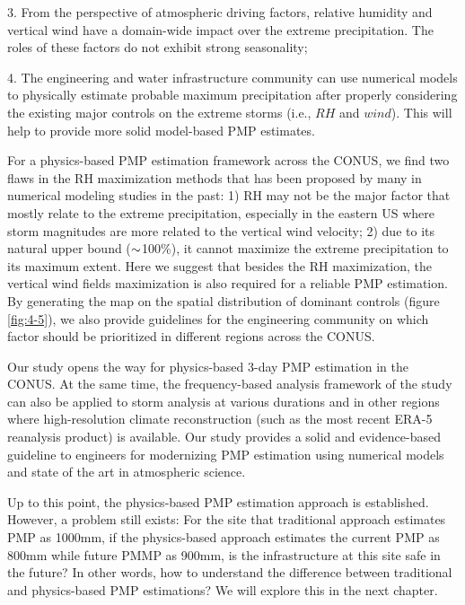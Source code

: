 3.	From the perspective of atmospheric driving factors, relative humidity and vertical wind have a domain-wide impact over the extreme precipitation. The roles of these factors do not exhibit strong seasonality;

4.	The engineering and water infrastructure community can use numerical models to physically estimate probable maximum precipitation after properly considering the existing major controls on the extreme storms (i.e., $RH$ and $wind$). This will help to provide more solid model-based PMP estimates.

For a physics-based PMP estimation framework across the CONUS, we find two flaws in the RH maximization methods that has been proposed by many in numerical modeling studies in the past: 1) RH may not be the major factor that mostly relate to the extreme precipitation, especially in the eastern US where storm magnitudes are more related to the vertical wind velocity; 2) due to its natural upper bound ($\scriptsize{\sim}$100\%), it cannot maximize the extreme precipitation to its maximum extent. Here we suggest that besides the RH maximization, the vertical wind fields maximization is also required for a reliable PMP estimation. By generating the map on the spatial distribution of dominant controls (figure \ref{fig:4-5}), we also provide guidelines for the engineering community on which factor should be prioritized in different regions across the CONUS.

Our study opens the way for physics-based 3-day PMP estimation in the CONUS. At the same time, the frequency-based analysis framework of the study can also be applied to storm analysis at various durations and in other regions where high-resolution climate reconstruction (such as the most recent ERA-5 reanalysis product) is available. Our study provides a solid and evidence-based guideline to engineers for modernizing PMP estimation using numerical models and state of the art in atmospheric science.

Up to this point, the physics-based PMP estimation approach is established. However, a problem still exists: For the site that traditional approach estimates PMP as 1000mm, if the physics-based approach estimates the current PMP as 800mm while future PMMP as 900mm, is the infrastructure at this site safe in the future? In other words, how to understand the difference between traditional and physics-based PMP estimations? We will explore this in the next chapter.